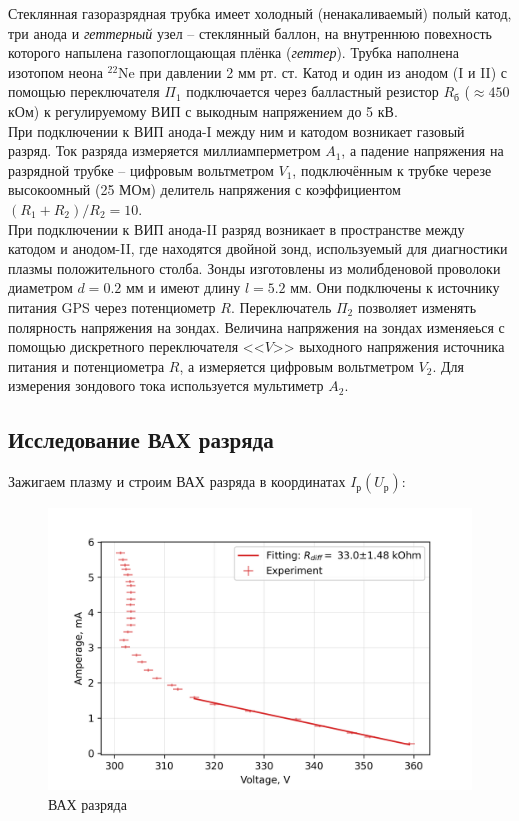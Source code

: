 Стеклянная газоразрядная трубка имеет холодный (ненакаливаемый) полый катод, три анода и \textit{геттерный} узел -- стеклянный баллон, на внутреннюю повехность которого напылена газопоглощающая плёнка (\textit{геттер}). Трубка наполнена изотопом неона $^22$Ne при давлении 2 мм рт. ст. Катод и один из анодом (I и II) с помощью переключателя $\Pi_1$ подключается через балластный резистор $R_\text{б}$ ($\approx 450$ кОм) к регулируемому ВИП с выкодным напряжением до 5 кВ.\\
При подключении к ВИП анода-I между ним и катодом возникает газовый разряд. Ток разряда измеряется миллиамперметром $A_1$, а падение напряжения на разрядной трубке -- цифровым вольтметром $V_1$, подключённым к трубке черезе высокоомный (25 МОм) делитель напряжения с коэффициентом $(R_1+R_2)/R_2 = 10$.\\
При подключении к ВИП анода-II разряд возникает в пространстве между катодом и анодом-II, где находятся двойной зонд, используемый для диагностики плазмы положительного столба. Зонды изготовлены из молибденовой проволоки диаметром $d = 0.2$ мм и имеют длину $l = 5.2$ мм. Они подключены к источнику питания GPS через потенциометр $R$. Переключатель $\Pi_2$ позволяет изменять полярность напряжения на зондах. Величина напряжения на зондах изменяеься с помощью дискретного переключателя <<$V$>> выходного напряжения источника питания и потенциометра $R$, а измеряется цифровым вольтметром $V_2$. Для измерения зондового тока используется мультиметр $A_2$.


\subsection*{Исследование ВАХ разряда}
Зажигаем плазму и строим ВАХ разряда в координатах $I_\text{р}(U_\text{р})$:

\begin{figure}[!h]
    \centering
    \includegraphics[height=\imageheight]{images/vah-discharge.png}
    \caption{ВАХ разряда}
    \label{fig:vah-discharge}
\end{figure}

